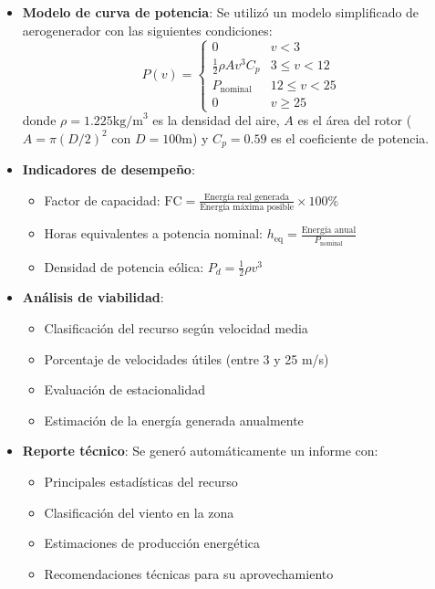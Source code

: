 \documentclass[a4paper,12pt]{article}
\begin{document}
		\begin{itemize}
			\item \textbf{Modelo de curva de potencia}: Se utilizó un modelo simplificado de aerogenerador con las siguientes condiciones:
			\begin{equation}
				P(v) = 
				\begin{cases} 
					0 & v < 3 \\
					\frac{1}{2} \rho A v^3 C_p & 3 \leq v < 12 \\
					P_{\text{nominal}} & 12 \leq v < 25 \\
					0 & v \geq 25
				\end{cases}
				\label{eq:potencia}
			\end{equation}
			donde \(\rho = 1.225  \text{kg/m}^3\) es la densidad del aire, \(A\) es el área del rotor (\(A = \pi (D/2)^2\) con \(D = 100  \text{m}\)) y \(C_p = 0.59\) es el coeficiente de potencia.
			
			\item \textbf{Indicadores de desempeño}:
			\begin{itemize}
				\item Factor de capacidad: \(\text{FC} = \frac{\text{Energía real generada}}{\text{Energía máxima posible}} \times 100\%\)
				\item Horas equivalentes a potencia nominal: \(h_{\text{eq}} = \frac{\text{Energía anual}}{P_{\text{nominal}}}\)
				\item Densidad de potencia eólica: \(P_d = \frac{1}{2} \rho v^3\)
			\end{itemize}
			
			\item \textbf{Análisis de viabilidad}:
			\begin{itemize}
				\item Clasificación del recurso según velocidad media
				\item Porcentaje de velocidades útiles (entre 3 y 25 m/s)
				\item Evaluación de estacionalidad
				\item Estimación de la energía generada anualmente
			\end{itemize}
			
			\item \textbf{Reporte técnico}: Se generó automáticamente un informe con:
			\begin{itemize}
				\item Principales estadísticas del recurso
				\item Clasificación del viento en la zona
				\item Estimaciones de producción energética
				\item Recomendaciones técnicas para su aprovechamiento
			\end{itemize}
		\end{itemize}
\end{document}
